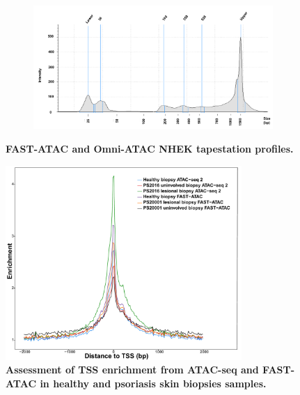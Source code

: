 \begin{figure}[htbp]
\begin{subfigure}{0.70\textwidth}
\caption{\textbf{}} %
\end{subfigure}
\begin{subfigure}{0.70\textwidth}
\centering
\includegraphics[width=\textwidth]{./Appendix/pdfs/Chapter3/Omni_ATAC_NHEK_Rep1_tapestation}
\caption{\textbf{}} %
\end{subfigure}
\hfill
\caption[FAST-ATAC and Omni-ATAC NHEK tapestation profiles.]{\textbf{FAST-ATAC and Omni-ATAC NHEK tapestation profiles.} \\
}
\label{fig:NHEK_tapestation}
\end{figure}



\begin{figure}[htbp]
\centering
\includegraphics[width=0.8\textwidth]{./Appendix/pdfs/Chapter3/ATAC_skin_biopsy_samples_all_methods_TSS_enrichment_supplementary}
\caption[Assessment of TSS enrichment from ATAC-seq and FAST-ATAC in healthy and psoriasis skin biopsies samples.]{\textbf{Assessment of TSS enrichment from ATAC-seq and FAST-ATAC in healthy and psoriasis skin biopsies samples.}  }
\label{fig:TSS_skin_biopsies}
\end{figure}



